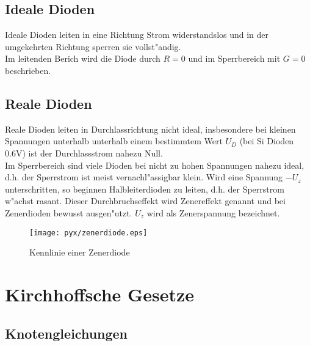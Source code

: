 \documentclass[german, 10pt, a4paper, headsepline]{scrreprt}
\theoremstyle{remark}
\begin{document}
\subsection{Ideale Dioden}


Ideale Dioden leiten in eine Richtung Strom widerstandslos und in der umgekehrten Richtung sperren sie vollst"andig.\\

Im leitenden Berich wird die Diode durch $R=0$ und im Sperrbereich mit $G=0$ beschrieben.

\subsection{Reale Dioden}

Reale Dioden leiten in Durchlassrichtung  nicht ideal, insbesondere bei kleinen Spannungen unterhalb unterhalb einem bestimmtem Wert $U_D$ (bei Si Dioden 0.6V) ist der Durchlassstrom  nahezu Null.\\
Im Sperrbereich  sind viele Dioden bei nicht zu hohen Spannungen nahezu ideal, d.h. der Sperrstrom  ist meist vernachl"assigbar klein. Wird eine Spannung $-U_z$ unterschritten, so beginnen Halbleiterdioden zu leiten, d.h. der Sperrstrom w"achst rasant. Dieser Durchbruchseffekt wird Zenereffekt  genannt und bei Zenerdioden  bewusst ausgen"utzt. $U_z$ wird als Zenerspannung  bezeichnet.

\begin{figure}[hbt]
 \begin{center}
	\texttt{[image: pyx/zenerdiode.eps]}
 \end{center}
 \label{zenerdiode}
 \caption{Kennlinie einer Zenerdiode}
\end{figure}

\section{Kirchhoffsche Gesetze}


\subsection{Knotengleichungen}
\end{document}
